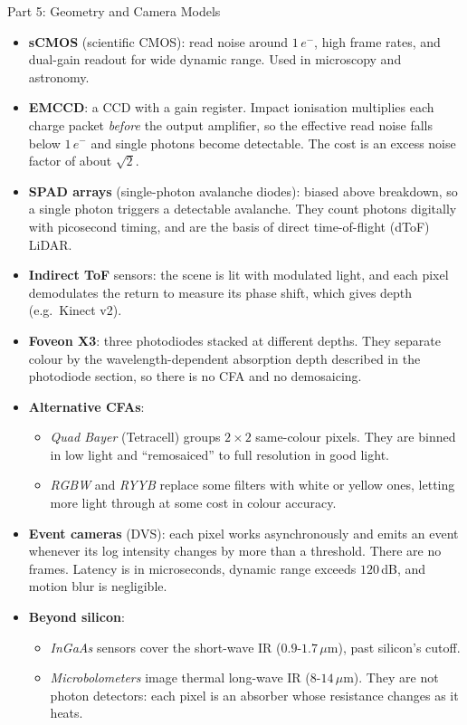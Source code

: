 \documentclass[letterpaper]{article}
\begin{document}
\begin{notes}{Part 5: Geometry and Camera Models}
\begin{itemize}
    \item \textbf{sCMOS} (scientific CMOS): read noise around $1\,e^-$, high frame rates, and dual-gain readout for wide dynamic range. Used in microscopy and astronomy.
    \item \textbf{EMCCD}: a CCD with a gain register. Impact ionisation multiplies each charge packet \emph{before} the output amplifier, so the effective read noise falls below $1\,e^-$ and single photons become detectable. The cost is an excess noise factor of about $\sqrt2$.
    \item \textbf{SPAD arrays} (single-photon avalanche diodes): biased above breakdown, so a single photon triggers a detectable avalanche. They count photons digitally with picosecond timing, and are the basis of direct time-of-flight (dToF) LiDAR.
    \item \textbf{Indirect ToF} sensors: the scene is lit with modulated light, and each pixel demodulates the return to measure its phase shift, which gives depth (e.g.\ Kinect v2).
    \item \textbf{Foveon X3}: three photodiodes stacked at different depths. They separate colour by the wavelength-dependent absorption depth described in the photodiode section, so there is no CFA and no demosaicing.
    \item \textbf{Alternative CFAs}:
    \begin{itemize}[noitemsep]
        \item \emph{Quad Bayer} (Tetracell) groups $2\times2$ same-colour pixels. They are binned in low light and ``remosaiced'' to full resolution in good light.
        \item \emph{RGBW} and \emph{RYYB} replace some filters with white or yellow ones, letting more light through at some cost in colour accuracy.
    \end{itemize}
    \item \textbf{Event cameras} (DVS): each pixel works asynchronously and emits an event whenever its log intensity changes by more than a threshold. There are no frames. Latency is in microseconds, dynamic range exceeds $120$\,dB, and motion blur is negligible.
    \item \textbf{Beyond silicon}:
    \begin{itemize}[noitemsep]
        \item \emph{InGaAs} sensors cover the short-wave IR ($0.9$-$1.7\,\mu$m), past silicon's cutoff.
        \item \emph{Microbolometers} image thermal long-wave IR ($8$-$14\,\mu$m). They are not photon detectors: each pixel is an absorber whose resistance changes as it heats.
    \end{itemize}
\end{itemize}


\end{notes}
\end{document}
